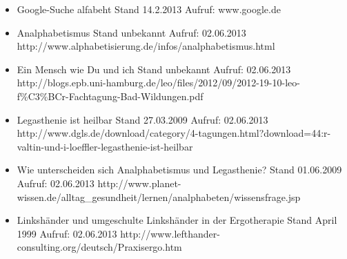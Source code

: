 \begin{itemize}
	\item {}
						{Google-Suche \glqq alfabeht\grqq}
						{Stand 14.2.2013}
						{Aufruf: }
						{www.google.de}
						
	\item {}
						{Analphabetismus}
						{Stand unbekannt}
						{Aufruf: 02.06.2013}
						{http://www.alphabetisierung.de/infos/analphabetismus.html}
						
	\item {}
						{Ein Mensch wie Du und ich}
						{Stand unbekannt}
						{Aufruf: 02.06.2013}
						{http://blogs.epb.uni-hamburg.de/leo/files/2012/09/2012-19-10-leo-f\%C3\%BCr-Fachtagung-Bad-Wildungen.pdf}
	
	\item {}
						{Legasthenie ist heilbar}
						{Stand 27.03.2009}
						{Aufruf: 02.06.2013}
						{http://www.dgls.de/download/category/4-tagungen.html?download=44:r-valtin-und-i-loeffler-legasthenie-ist-heilbar}
						
	\item {}
						{Wie unterscheiden sich Analphabetismus und Legasthenie?}
						{Stand 01.06.2009}
						{Aufruf: 02.06.2013}
						{http://www.planet-wissen.de/alltag_gesundheit/lernen/analphabeten/wissensfrage.jsp}
						
	\item {}
						{Linkshänder und umgeschulte Linkshänder in der Ergotherapie }
						{Stand April 1999}
						{Aufruf: 02.06.2013}
						{http://www.lefthander-consulting.org/deutsch/Praxisergo.htm}
\end{itemize}


